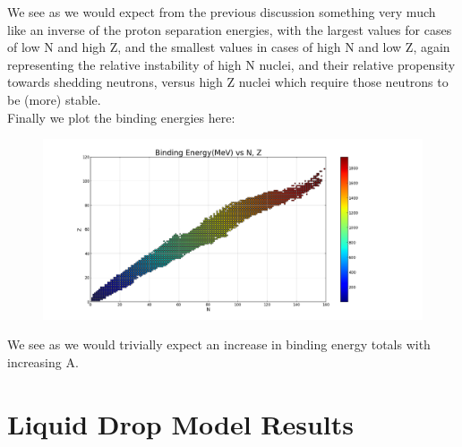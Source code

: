 \documentclass[11pt]{article} %
\begin{document}
We see as we would expect from the previous discussion something very much like an inverse of the proton separation energies, with the largest values for cases of low N and high Z, and the smallest values in cases of high N and low Z, again representing the relative instability of high N nuclei, and their relative propensity towards shedding neutrons, versus high Z nuclei which require those neutrons to be (more) stable.\\

Finally we plot the binding energies here:\\

\begin{figure}[h]
\centering
\includegraphics[width=\linewidth]{"BindingEnergy"}
\end{figure}

We see as we would trivially expect an increase in binding energy totals with increasing A.



\section{Liquid Drop Model Results}
\end{document}
